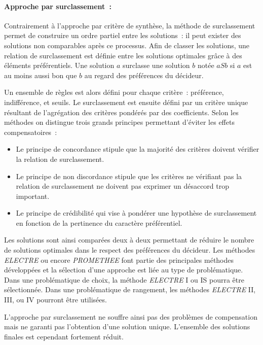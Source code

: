 \paragraph{Approche par surclassement~:} %
\label{par:approche_par_surclassement}
Contrairement à l’approche par critère de synthèse, la méthode de surclassement
permet de construire un ordre partiel entre les solutions~: il peut exister
des solutions non comparables après ce processus.
Afin de classer les solutions, une relation de surclassement est définie entre les
solutions optimales grâce à des éléments préférentiels.
Une solution $a$ surclasse une solution $b$ notée $aSb$ si $a$ est au moins aussi
bon que $b$ au regard des préférences du décideur.

Un ensemble de règles est alors défini pour chaque critère~: préférence, indifférence,
et seuils. Le surclassement est ensuite défini par un critère unique résultant de
l’agrégation des critères pondérés par des coefficients. Selon les méthodes on distingue
trois grands principes permettant d’éviter les effets compensatoires~:
\begin{itemize}
  \item Le principe de concordance stipule que la majorité des critères doivent
        vérifier la relation de surclassement.
  \item Le principe de non discordance stipule que les critères ne vérifiant pas
        la relation de surclassement ne doivent pas exprimer un désaccord trop
        important.
  \item Le principe de crédibilité qui vise à pondérer une hypothèse de surclassement
        en fonction de la pertinence du caractère préférentiel.
\end{itemize}
Les solutions sont ainsi comparées deux à deux permettant de réduire le nombre de
solutions optimales dans le respect des préférences du décideur. Les méthodes
\textit{ELECTRE} ou encore \textit{PROMETHEE} font partie des principales méthodes développées
et la sélection d’une approche est liée au type de problématique. Dans une problématique de
choix, la méthode \textit{ELECTRE} I ou IS pourra être sélectionnée. Dans une
problématique de rangement, les méthodes \textit{ELECTRE} II, III, ou IV pourront être
utilisées.

L’approche par surclassement ne souffre ainsi pas des problèmes de compensation
mais ne garanti pas l’obtention d’une solution unique. L’ensemble des solutions
finales est cependant fortement réduit.



